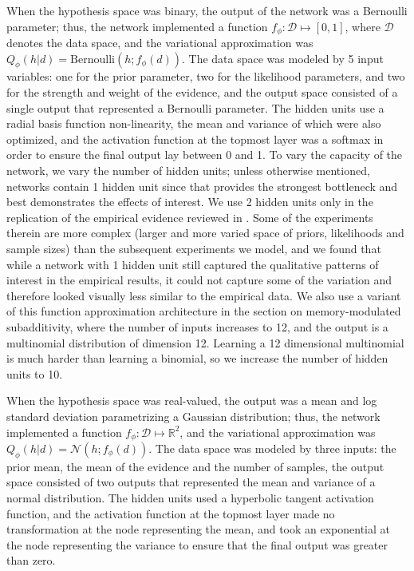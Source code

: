 When the hypothesis space was binary, the output of the network was a Bernoulli parameter; thus, the network implemented a function $f_\phi: \mathcal{D} \mapsto [0,1]$, where $\mathcal{D}$ denotes the data space, and the variational approximation was $Q_\phi(h|d) = \text{Bernoulli}(h; f_\phi(d))$. The data space was modeled by 5 input variables: one for the prior parameter, two for the likelihood parameters, and two for the strength and weight of the evidence, and the output space consisted of a single output that represented a Bernoulli parameter. The hidden units use a radial basis function non-linearity, the mean and variance of which were also optimized, and the activation function at the topmost layer was a softmax in order to ensure the final output lay between 0 and 1. To vary the capacity of the network, we vary the number of hidden units; unless otherwise mentioned, networks contain 1 hidden unit since that provides the strongest bottleneck and best demonstrates the effects of interest. We use 2 hidden units only in the replication of the empirical evidence reviewed in \citet{benjamin18}. Some of the experiments therein are more complex (larger and more varied space of priors, likelihoods and sample sizes) than the subsequent experiments we model, and we found that while a network with 1 hidden unit still captured the qualitative patterns of interest in the empirical results, it could not capture some of the variation and therefore looked visually less similar to the empirical data. We also use a variant of this function approximation architecture in the section on memory-modulated subadditivity, where the number of inputs increases to 12, and the output is a multinomial distribution of dimension 12. 
Learning a 12 dimensional multinomial is much harder than learning a binomial, so we increase the number of hidden units to 10.

When the hypothesis space was real-valued, the output was a mean and log standard deviation parametrizing a Gaussian distribution; thus, the network implemented a function $f_\phi: \mathcal{D} \mapsto \mathbb{R}^2$, and the variational approximation was $Q_\phi(h|d) = \mathcal{N}(h; f_\phi(d))$. The data space was modeled by three inputs: the prior mean, the mean of the evidence and the number of samples, the output space consisted of two outputs that represented the mean and variance of a normal distribution. The hidden units used a hyperbolic tangent activation function, and the activation function at the topmost layer made no transformation at the node representing the mean, and took an exponential at the node representing the variance to ensure that the final output was greater than zero.

